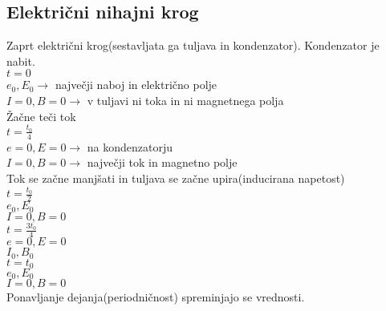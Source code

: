 {\color{indiagreen}\subsection{Električni nihajni krog}}
Zaprt električni krog(sestavljata ga tuljava in kondenzator). Kondenzator je nabit.\\
$t = 0$\\
$e_0, E_0 \rightarrow$ največji naboj in električno polje\\
$I = 0, B = 0 \rightarrow$ v tuljavi ni toka in ni magnetnega polja\\
Žačne teči tok\\
$t = \frac{t_0}{4}$\\
$e = 0, E = 0 \rightarrow$ na kondenzatorju\\
$I = 0, B = 0 \rightarrow$ največji tok in magnetno polje\\
Tok se začne manjšati in tuljava se začne upira(inducirana napetost)\\
$t = \frac{t_0}{2}$\\
$e_0, E_0$\\
$I = 0, B = 0$\\
$t = \frac{3t_0}{4}$\\
$e = 0, E = 0$\\
$I_0, B_0$\\
$t = t_0$\\
$e_0, E_0$\\
$I = 0, B = 0$\\
Ponavljanje dejanja(periodničnost) spreminjajo se vrednosti.\\